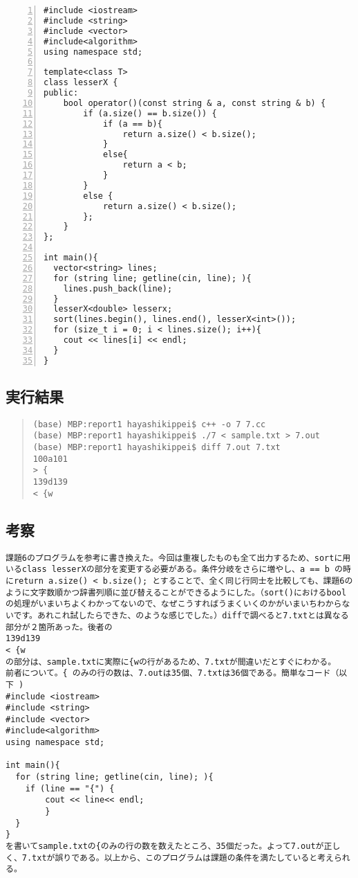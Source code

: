 \documentclass[11pt,a4paper]{jsarticle}
\begin{document}
\begin{lstlisting}[numbers=left,numberstyle=\ttfamily,xleftmargin=2zw]
#include <iostream>
#include <string>
#include <vector>
#include<algorithm>
using namespace std;

template<class T>
class lesserX {
public:
    bool operator()(const string & a, const string & b) {
        if (a.size() == b.size()) {
            if (a == b){
                return a.size() < b.size();
            }
            else{
                return a < b;
            }
        }
        else {
            return a.size() < b.size();
        };
    }
};

int main(){
  vector<string> lines;
  for (string line; getline(cin, line); ){
    lines.push_back(line);
  }
  lesserX<double> lesserx;
  sort(lines.begin(), lines.end(), lesserX<int>());
  for (size_t i = 0; i < lines.size(); i++){
    cout << lines[i] << endl;
  }
}
\end{lstlisting}
%
\subsection{実行結果}
\begin{quote}           %
\begin{verbatim}
(base) MBP:report1 hayashikippei$ c++ -o 7 7.cc
(base) MBP:report1 hayashikippei$ ./7 < sample.txt > 7.out
(base) MBP:report1 hayashikippei$ diff 7.out 7.txt
100a101
> {
139d139
< {w
\end{verbatim}
\end{quote}
%
\subsection{考察}
\begin{verbatim}
課題6のプログラムを参考に書き換えた。今回は重複したものも全て出力するため、sortに用いるclass lesserXの部分を変更する必要がある。条件分岐をさらに増やし、a == b の時にreturn a.size() < b.size(); とすることで、全く同じ行同士を比較しても、課題6のように文字数順かつ辞書列順に並び替えることができるようにした。（sort()におけるboolの処理がいまいちよくわかってないので、なぜこうすればうまくいくのかがいまいちわからないです。あれこれ試したらできた、のような感じでした。）diffで調べると7.txtとは異なる部分が２箇所あった。後者の
139d139
< {w
の部分は、sample.txtに実際に{wの行があるため、7.txtが間違いだとすぐにわかる。
前者について。{ のみの行の数は、7.outは35個、7.txtは36個である。簡単なコード（以下 )
#include <iostream>
#include <string>
#include <vector>
#include<algorithm>
using namespace std;

int main(){
  for (string line; getline(cin, line); ){
    if (line == "{") {
        cout << line<< endl;
        }
  }
}
を書いてsample.txtの{のみの行の数を数えたところ、35個だった。よって7.outが正しく、7.txtが誤りである。以上から、このプログラムは課題の条件を満たしていると考えられる。
\end{verbatim}
\end{document}
